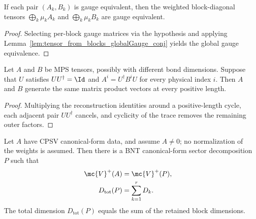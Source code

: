 \begin{lemma}%
    \label{lem:gauge_equiv_from_block_gauge}
    \leanok
    If each pair $(A_k, B_k)$ is gauge equivalent, then the weighted
    block-diagonal tensors $\bigoplus_k \mu_k A_k$ and
    $\bigoplus_k \mu_k B_k$ are gauge equivalent.
\end{lemma}

\begin{proof}\leanok
    Selecting per-block gauge matrices via the hypothesis and applying
    Lemma~\ref{lem:tensor_from_blocks_globalGauge_conj} yields the global
    gauge equivalence.
\end{proof}

\begin{lemma}%
    \label{thm:coisometry_reconstruction_same_mpv_pos}
    \leanok
    Let $A$ and $B$ be MPS tensors, possibly with different bond dimensions.
    Suppose that $U$ satisfies $UU^\dagger=\Id$ and
    $A^i=U^\dagger B^iU$ for every physical index $i$. Then $A$ and $B$
    generate the same matrix product vectors at every positive length.
\end{lemma}

\begin{proof}\leanok
    Multiplying the reconstruction identities around a positive-length cycle,
    each adjacent pair $UU^\dagger$ cancels, and cyclicity of the trace removes
    the remaining outer factors.
\end{proof}

\begin{lemma}%
    \label{thm:cpsv_sector_bnt}
    \leanok
    Let $A$ have CPSV canonical-form data, and assume $A\ne0$; no
    normalization of the weights is assumed. Then
    there is a BNT canonical-form sector decomposition $P$ such that
    \begin{align}
        \mc{V}^+(A) & =\mc{V}^+(P),
        \notag                            \\
        D_{\mathrm{tot}}(P)
                    & =\sum_{k=1}^{r}D_k.
        \label{eq:cpsv_active_sector_total_dim}
    \end{align}
    The total dimension $D_{\mathrm{tot}}(P)$ equals the sum of the retained
    block dimensions.
\end{lemma}

